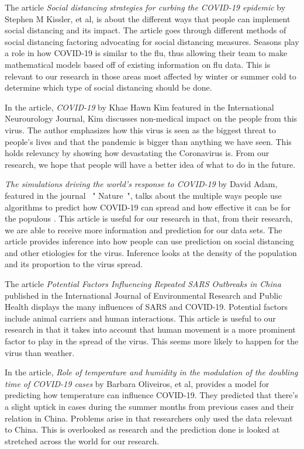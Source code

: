 \documentclass[10pt,journal,compsoc]{IEEEtran}
\begin{document}
	The article \textit{Social distancing strategies for curbing the COVID-19 epidemic} by Stephen M Kissler, et al, is about the different ways that people can implement social distancing and its impact. \cite{Kissler-2020} The article goes through different methods of social distancing factoring advocating for social distancing measures. Seasons play a role in how COVID-19 is similar to the flu, thus allowing their team to make mathematical models based off of existing information on flu data. This is relevant to our research in those areas most affected by winter or summer cold to determine which type of social distancing should be done.

	In the article, \textit{COVID-19} by Khae Hawn Kim featured in the International Neurourology Journal, Kim discusses non-medical impact on the people from this virus. \cite{Kim-2020} The author emphasizes how this virus is seen as the biggest threat to people's lives and that the pandemic is bigger than anything we have seen. This holds relevancy by showing how devastating the Coronavirus is. From our research, we hope that people will have a better idea of what to do in the future.

	 \textit{The simulations driving the world’s response to COVID-19} by David Adam, featured in the journal \ " Nature\ ", talks about the multiple ways people use algorithms to predict how COVID-19 can spread and how effective it can be for the populous \cite{Adam-2020}. This article is useful for our research in that, from their research, we are able to receive more information and prediction for our data sets. The article provides inference into how people can use prediction on social distancing and other etiologies for the virus. \cite{Adam-2020} Inference looks at the density of the population and its proportion to the virus spread.

	The article \textit{Potential Factors Influencing Repeated SARS Outbreaks in China} published in the International Journal of Environmental Research and Public Health displays the many influences of SARS and COVID-19. \cite{Sun-2020} Potential factors include animal carriers and human interactions. \cite{Sun-2020} This article is useful to our research in that it takes into account that human movement is a more prominent factor to play in the spread of the virus. This seems more likely to happen for the virus than weather.

	In the article, \textit{Role of temperature and humidity in the modulation of the doubling time of COVID-19 cases} by Barbara Oliveiros, et al, provides a model for predicting how temperature can influence COVID-19. \cite{Oliveiros-2020} They predicted that there's a slight uptick in cases during the summer months from previous cases and their relation in China. \cite{Oliveiros-2020} Problems arise in that researchers only used the data relevant to China. \cite{Oliveiros-2020} This is overlooked as research and the prediction done is looked at stretched across the world for our research.
\end{document}
